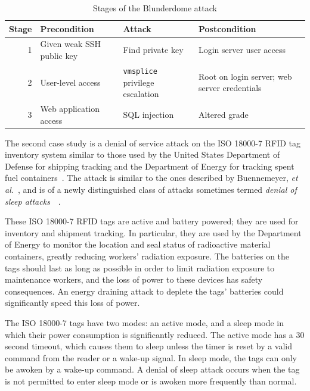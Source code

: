 \begin{table}
\centering
\begin{tabular}{r|p{1.25in}|p{1.35in}|p{1.75in}}
Stage & Precondition	&	Attack	&	Postcondition \\ \hline \hline
1 & \raggedright Given weak SSH public key
	& \raggedright Find private key &  Login server user access \\ \hline
2 & \raggedright User-level access & \raggedright \texttt{vmsplice} privilege escalation 
	& Root on login server; web server credentials \\ \hline
3 & \raggedright Web application access & \raggedright SQL injection & Altered grade
\end{tabular}
\caption{Stages of the Blunderdome attack}
\label{table:blundertasks}
\end{table}
\label{sec:bg:rfid}
The second case study is a denial of service attack
on the ISO 18000-7 RFID tag inventory system similar to those used by the United States
Department of Defense for shipping tracking and the Department of Energy for tracking spent
fuel containers~\cite{chen2009radiofrequency}. The attack
is similar to the ones described by Buennemeyer, \emph{et al.}~\cite{buennemeyer2006battery},
and is of a newly distinguished class of attacks sometimes termed \emph{denial
of sleep attacks}~\cite{brownfield2005wireless}~\cite{raymond2009effects}.

These ISO 18000-7 RFID tags are active and battery powered; they are used for inventory and
shipment tracking. In particular, they are used by the Department of Energy to monitor
the location and seal status of
radioactive material containers, greatly reducing workers' radiation exposure. 
The batteries on the tags should last as long as
possible in order to limit radiation exposure to maintenance workers, and
the loss of power to these devices has safety consequences.
An energy draining attack to deplete the tags' batteries could significantly
speed this loss of power.

The ISO 18000-7 tags have two modes: an active mode, and a sleep mode in which their
power consumption is significantly reduced. The active mode has a 30 second timeout,
which causes them to sleep unless the timer is reset by a valid
command from the reader or a wake-up signal. In sleep mode, the tags can only
be awoken by a wake-up command.
A denial of sleep attack occurs when the tag is not permitted to enter sleep mode or is
awoken more frequently than normal.

